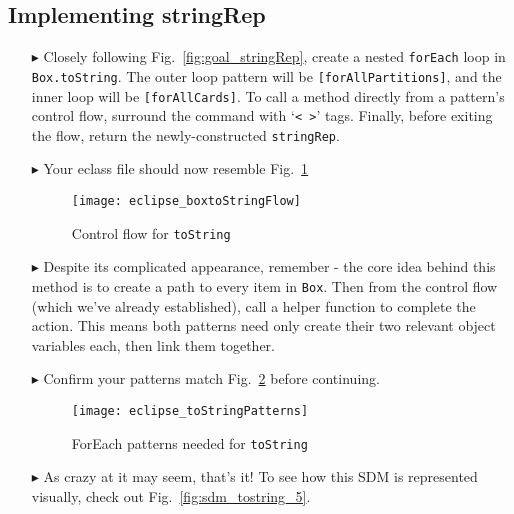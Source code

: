 \newpage
\subsection{Implementing stringRep}
\texHeader
\hypertarget{stringRep tex}{}

\vspace{0.5cm}

\begin{itemize}
  
\item[$\blacktriangleright$] Closely following Fig.~\ref{fig:goal_stringRep}, create a nested \texttt{forEach} loop in \texttt{Box.toString}. The outer loop
pattern will be \texttt{[forAllPartitions]}, and the inner loop will be \texttt{[forAllCards]}. To call a method directly from a pattern's control flow,
surround the command with `\texttt{< >}' tags. Finally, before exiting the flow, return the newly-constructed \texttt{stringRep}.

\vspace{0.5cm}

\item[$\blacktriangleright$] Your eclass file should now resemble Fig.~\ref{fig:toStringFlow}

\vspace{0.5cm}

\begin{figure}[htp]
\begin{center}
  \texttt{[image: eclipse\_boxtoStringFlow]}
  \caption{Control flow for \texttt{toString}}
  \label{fig:toStringFlow}
\end{center}
\end{figure}

\vspace{0.5cm}

\item[$\blacktriangleright$] Despite its complicated appearance, remember - the core idea behind this method is to create a path to every item in
\texttt{Box}. Then from the control flow (which we've already established), call a helper function to complete the action. This means both patterns need only
create their two relevant object variables each, then link them together.

\item[$\blacktriangleright$] Confirm your patterns match Fig.~\ref{fig:toStringPatterns} before continuing.

\begin{figure}[htp]
\begin{center}
  \texttt{[image: eclipse\_toStringPatterns]}
  \caption{ForEach patterns needed for \texttt{toString}}
  \label{fig:toStringPatterns}
\end{center}
\end{figure}

\vspace{0.5cm}

\item[$\blacktriangleright$] As crazy at it may seem, that's it!  To
see how this SDM is represented visually, check out Fig.~\ref{fig:sdm_tostring_5}.

\end{itemize}
